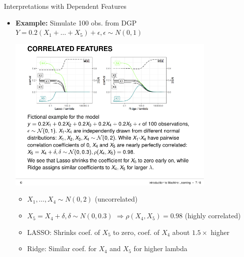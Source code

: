 \documentclass[11pt,compress,t,notes=noshow, aspectratio=169, xcolor=table]{beamer}
\begin{document}
\begin{frame}{Interpretations with Dependent Features}
\begin{itemize}

\item \textbf{Example:} Simulate 100 obs. from DGP $Y = 0.2 (X_1 + \dots + X_5) + \epsilon, \epsilon \sim N(0,1)$

\centerline{%
\includegraphics[trim=0px 110px 30px 0px, clip, width=0.8\textwidth]{figure/ridge_lasso} }%
        
\begin{itemize}
    \item $X_1, \dots, X_4 \sim N(0, 2)$ (uncorrelated)
    \item $X_5 = X_4 + \delta, \delta \sim N(0, 0.3)$ $\Rightarrow \rho(X_4, X_5) = 0.98$ (highly correlated)
    \item LASSO: Shrinks coef. of $X_5$ to zero, coef. of $X_4$ about $1.5 \times$ higher
    \item Ridge: Similar coef. for $X_4$ and $X_5$ for higher lambda
\end{itemize}

\end{itemize}

\end{frame}
\end{document}
